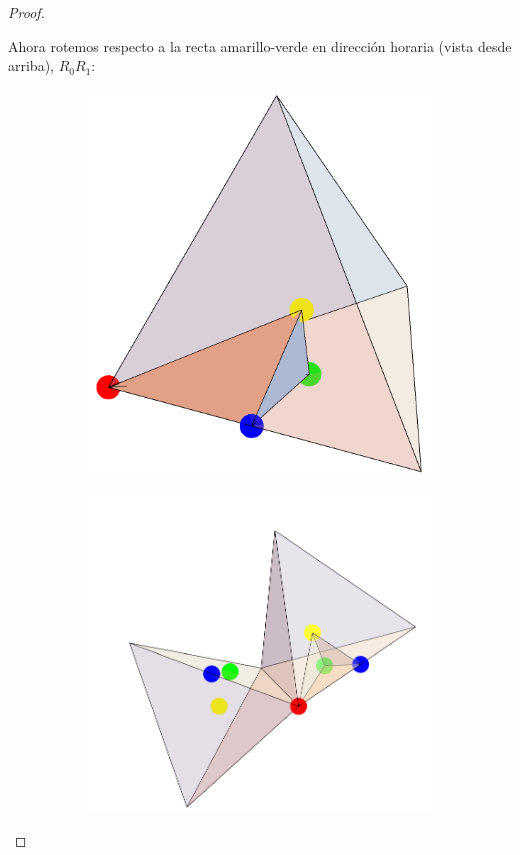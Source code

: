 \documentclass[spanish]{article}
\theoremstyle{definition}
\begin{document}
\begin{proof}
\begin{figure}[H]
\begin{subfigure}{0.5\linewidth}
	\end{subfigure}
	\end{figure}
	Ahora rotemos respecto a la recta amarillo-verde en dirección horaria (vista desde arriba), $R_0R_1$:
	\begin{figure}[H]
	\begin{subfigure}{0.4\linewidth}
		\centering
		\includegraphics[width=0.6\linewidth]{p5}
	\end{subfigure}
	\begin{subfigure}{0.4\linewidth}
		\centering
		\includegraphics[width=0.9\linewidth]{p7}

\end{subfigure}
\end{figure}
\end{proof}
\end{document}
